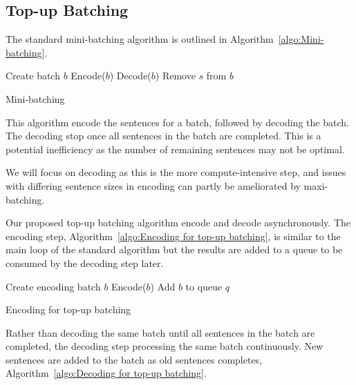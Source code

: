 \documentclass[11pt,a4paper]{article}
\begin{document}
\subsection{Top-up Batching}

The standard mini-batching algorithm is outlined in Algorithm~\ref{algo:Mini-batching}.

\begin{algorithm}
\begin{algorithmic}
  \State Create batch $b$
  \State Encode($b$)
    \State Decode($b$)
        \State Remove $s$ from $b$
      \EndIf
    \EndFor
  \EndWhile
\EndWhile

\EndProcedure

\end{algorithmic}
\caption{Mini-batching}
\label{algo:Mini-batching}
\end{algorithm}

This algorithm encode the sentences for a batch, followed by decoding the batch. The decoding stop once all sentences in the batch are completed. This is a potential inefficiency as the number of remaining sentences may not be optimal.

We will focus on decoding as this is the more compute-intensive step, and issues with differing sentence sizes in encoding can partly be ameliorated by maxi-batching.

Our proposed top-up batching algorithm encode and decode asynchronously. The encoding step, Algorithm~\ref{algo:Encoding for top-up batching}, is similar to the main loop of the standard algorithm but the results are added to a queue to be consumed by the decoding step later.

\begin{algorithm}
\begin{algorithmic}

  \State Create encoding batch $b$
  \State Encode($b$)
  \State Add $b$ to queue $q$
\EndWhile 

\EndProcedure

\end{algorithmic}
\caption{Encoding for top-up batching}
\label{algo:Encoding for top-up batching}
\end{algorithm}

Rather than decoding the same batch until all sentences in the batch are completed, the decoding step processing the same batch continuously. New sentences are added to the batch as old sentences completes, Algorithm~\ref{algo:Decoding for top-up batching}.
\end{document}
